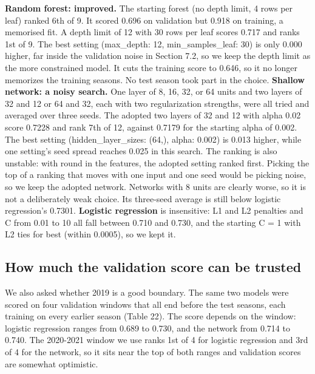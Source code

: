 \documentclass[10pt,a4paper]{article}
\begin{document}
\textbf{Random forest: improved.} The starting forest (no depth limit, 4 rows per leaf) ranked 6th of 9. It scored 0.696 on validation but 0.918 on training, a memorised fit. A depth limit of 12 with 30 rows per leaf scores 0.717 and ranks 1st of 9. The best setting (max\_depth: 12, min\_samples\_leaf: 30) is only 0.000 higher, far inside the validation noise in Section 7.2, so we keep the depth limit as the more constrained model. It cuts the training score to 0.646, so it no longer memorizes the training seasons. No test season took part in the choice. \textbf{Shallow network: a noisy search.} One layer of 8, 16, 32, or 64 units and two layers of 32 and 12 or 64 and 32, each with two regularization strengths, were all tried and averaged over three seeds. The adopted two layers of 32 and 12 with alpha 0.02 score 0.7228 and rank 7th of 12, against 0.7179 for the starting alpha of 0.002. The best setting (hidden\_layer\_sizes: (64,), alpha: 0.002) is 0.013 higher, while one setting's seed spread reaches 0.025 in this search. The ranking is also unstable: with round in the features, the adopted setting ranked first. Picking the top of a ranking that moves with one input and one seed would be picking noise, so we keep the adopted network. Networks with 8 units are clearly worse, so it is not a deliberately weak choice. Its three-seed average is still below logistic regression's 0.7301. \textbf{Logistic regression} is insensitive: L1 and L2 penalties and C from 0.01 to 10 all fall between 0.710 and 0.730, and the starting C = 1 with L2 ties for best (within 0.0005), so we kept it.



\subsection{How much the validation score can be trusted}


We also asked whether 2019 is a good boundary. The same two models were scored on four validation windows that all end before the test seasons, each training on every earlier season (Table 22). The score depends on the window: logistic regression ranges from 0.689 to 0.730, and the network from 0.714 to 0.740. The 2020-2021 window we use ranks 1st of 4 for logistic regression and 3rd of 4 for the network, so it sits near the top of both ranges and validation scores are somewhat optimistic.
\end{document}
